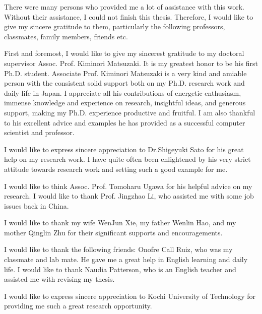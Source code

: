 

\begin{acknowledgements}      %


There were many persons who provided me a lot of assistance with this work. 
Without their assistance, I could not finish this thesis. Therefore, 
I would like to give my sincere
gratitude to them, particularly the following professors, classmates, family
members, friends etc.

First and foremost, I would like to give my sincerest gratitude to my doctoral
supervisor Assoc. Prof. Kiminori Matsuzaki. It is my greatest honor to be his
first Ph.D. student. Associate Prof. Kiminori Matsuzaki is a very kind and amiable
person with the consistent solid support both on my Ph.D. research work and
daily life in Japan. I appreciate all his contributions of energetic enthusiasm,
immense knowledge and experience on research, insightful ideas, and generous
support, making my Ph.D. experience productive and fruitful. I am also thankful
to his excellent advice and examples he has provided as a successful computer
scientist and professor.


I would like to express sincere appreciation to Dr.Shigeyuki Sato for his great
help on my research work. I have quite often been enlightened by his very strict
attitude towards research work and setting such a good example for me.

I would like to think Assoc. Prof. Tomoharu Ugawa for his helpful advice 
on my research. I would like to thank Prof. Jingzhao Li, who assisted me 
with some job issues back in China. 

I would like to thank my wife WenJun Xie, my father Wenlin Hao, and my
mother Qinglin Zhu for their significant supports and encouragements.

I would like to thank the following friends: Onofre Call Ruiz, who was my 
classmate and lab mate. He gave me a great help in English learning and 
daily life. I would like to thank Naudia Patterson, who is an English 
teacher and assisted me with revising my thesis.

 

I would like to express sincere appreciation to Kochi University of Technology
for providing me such a great research opportunity.


\end{acknowledgements}



